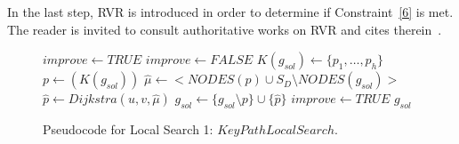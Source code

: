 \documentclass{llncs}
\begin{document}
In the last step, RVR is introduced in order to determine if Constraint~\ref{6} is met. The reader is invited to consult authoritative works on RVR and cites therein~\cite{85}.  

\begin{figure}[H]
\begin{algorithm}[H]
\caption{$g_{sol} = KeyPathLocalSearch(G_B,C,g_{sol})$}
\begin{algorithmic}[1]
\STATE $improve \leftarrow TRUE$
\STATE $improve \leftarrow FALSE$
\STATE $K(g_{sol}) \leftarrow \{p_1,\ldots,p_h\}$ 
\STATE $p \leftarrow(K(g_{sol}))$ 
\STATE $\hat{\mu} \leftarrow <NODES(p) \cup S_D\setminus NODES(g_{sol}) > $ 
\STATE $\hat{p} \leftarrow Dijkstra(u,v,\hat{\mu})$
\STATE $g_{sol} \leftarrow \{ g_{sol}\setminus p \} \cup \{\hat{p}\}$
\STATE $improve \leftarrow TRUE$
\ENDIF
\ENDWHILE
\ENDWHILE
\RETURN $g_{sol}$
\end{algorithmic}
\end{algorithm}
\caption{Pseudocode for Local Search 1: $KeyPathLocalSearch$.\label{alg-kpls}}
\end{figure}
\end{document}
